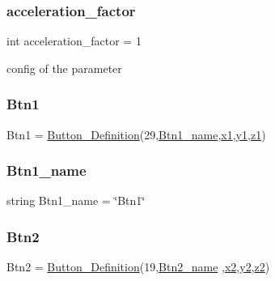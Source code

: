 \subsubsection{\texorpdfstring{acceleration\+\_\+factor}{acceleration\_factor}}
{\footnotesize\ttfamily int acceleration\+\_\+factor = 1}



config of the parameter 

\mbox{\label{a00025_af037c6b9ff0314103d8127acc9d07e0b}} 
\subsubsection{\texorpdfstring{Btn1}{Btn1}}
{\footnotesize\ttfamily Btn1 = \hyperlink{a00053}{Button\+\_\+\+Definition}(29,\hyperlink{a00025_a96d98afcb35718dbc4c13c5bf74cfd5b}{Btn1\+\_\+name},\hyperlink{a00025_a3389d8b95846602e8f94cc15f41e48e9}{x1},\hyperlink{a00025_a9fe80bf4738047a31d7c162807ed85f0}{y1},\hyperlink{a00025_a7da4886c0a2e03b8bb9ed62eb20efb78}{z1})}

\mbox{\label{a00025_a96d98afcb35718dbc4c13c5bf74cfd5b}} 
\subsubsection{\texorpdfstring{Btn1\+\_\+name}{Btn1\_name}}
{\footnotesize\ttfamily string Btn1\+\_\+name = \char`\"{}Btn1\char`\"{}}

\mbox{\label{a00025_a73afa8c52cebd94e1889df5fbe3bec66}} 
\subsubsection{\texorpdfstring{Btn2}{Btn2}}
{\footnotesize\ttfamily Btn2 = \hyperlink{a00053}{Button\+\_\+\+Definition}(19,\hyperlink{a00025_a9595d49d1fc79cce5a3f3af42cf8502a}{Btn2\+\_\+name} ,\hyperlink{a00025_a24d6ffb6e8780eef0c81cd97e3f4fdaf}{x2},\hyperlink{a00025_a07bcd014e69eddcf4243b2a961014eaf}{y2},\hyperlink{a00025_a55196b87940893e540ba636218f4eb07}{z2})}

